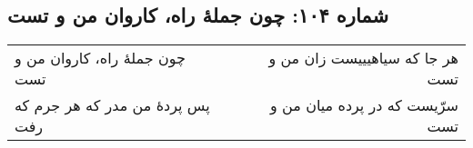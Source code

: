 \begin{center}
\section*{شماره ۱۰۴: چون جملۀ راه، کاروان من و تست}
\label{sec:104}
\begin{longtable}{l p{0.5cm} r}
چون جملهٔ راه، کاروان من و تست
&&
هر جا که سیاهیییست زان من و تست
\\
پس پردهٔ من مدر که هر جرم که رفت
&&
سرّیست که در پرده میان من و تست
\\
\end{longtable}
\end{center}
